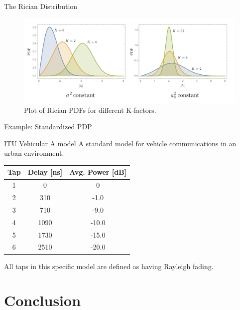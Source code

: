 \documentclass{beamer}
\begin{document}
	\begin{frame}{The Rician Distribution}
		\begin{figure}
			\centering
			\includegraphics[width=\linewidth]{pictures/rician-pdf.png}
			\caption{Plot of Rician PDFs for different K-factors.}
		\end{figure}
	\end{frame}
	
	
	
	\begin{frame}{Example: Standardized PDP}
		\begin{block}{ITU Vehicular A model}
			A standard model for vehicle communications in an urban environment.
			\begin{center}
				\begin{tabular}{ccc}
					\toprule
					Tap & Delay [ns] & Avg. Power [dB] \\
					\midrule
					1 & 0 & 0 \\
					2 & 310 & -1.0 \\
					3 & 710 & -9.0 \\
					4 & 1090 & -10.0 \\
					5 & 1730 & -15.0 \\
					6 & 2510 & -20.0 \\
					\bottomrule
				\end{tabular}
			\end{center}
			All taps in this specific model are defined as having Rayleigh fading.
		\end{block}
	\end{frame}
	
	\section{Conclusion}
	
\end{document}

